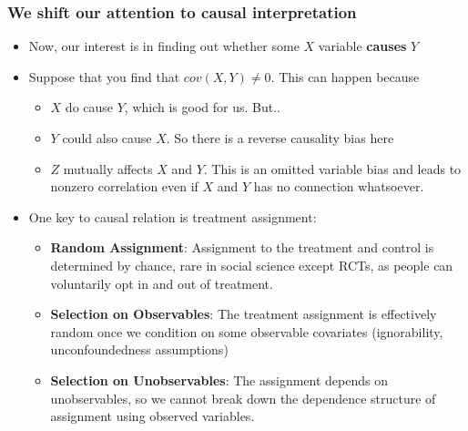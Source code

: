 \documentclass[aspectratio=169]{beamer}
\begin{document}
\begin{frame}
\frametitle{We shift our attention to causal interpretation}
\begin{itemize}
\item Now, our interest is in finding out whether some $X$ variable \textbf{causes} $Y$
\item Suppose that you find that $cov(X,Y)\neq0$. This can happen because
\begin{itemize}
\item $X$ do cause $Y$, which is good for us. But..
\item $Y$ could also cause $X$. So there is a reverse causality bias here
\item $Z$ mutually affects $X$ and $Y$. This is an omitted variable bias and leads to nonzero correlation even if $X$ and $Y$ has no connection whatsoever. 
\end{itemize}
\item One key to causal relation is treatment assignment:
\begin{itemize}
\item \textbf{Random Assignment}: Assignment to the treatment and control is determined by chance, rare in social science except  RCTs, as people can voluntarily opt in and out of treatment. 
\item \textbf{Selection on Observables}: The treatment assignment is effectively random once we condition on some observable covariates (ignorability, unconfoundedness assumptions)
\item \textbf{Selection on Unobservables}: The assignment depends on unobservables, so we cannot break down the dependence structure of assignment using observed variables. \end{itemize}
\end{itemize}
\end{frame}
\end{document}
